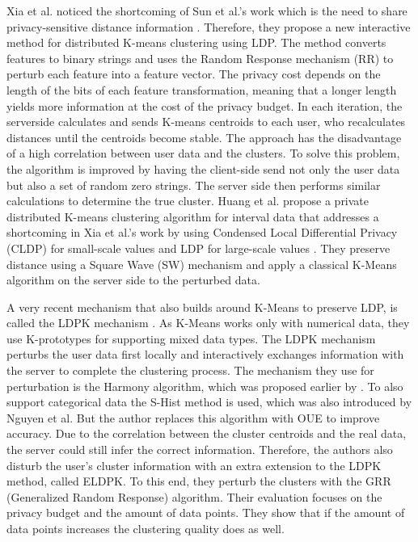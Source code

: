 Xia et al. noticed the shortcoming of Sun et al.'s work which is the need to share privacy-sensitive distance information \citep{xia_distributed_2020-1}.
Therefore, they propose a new interactive method for distributed K-means clustering using LDP.
The method converts features to binary strings and uses the Random Response mechanism (RR) to perturb each feature into a feature vector.
The privacy cost depends on the length of the bits of each feature transformation, meaning that a longer length yields more information at the cost of the privacy budget.
In each iteration, the serverside calculates and sends K-means centroids to each user, who recalculates distances until the centroids become stable.
The approach has the disadvantage of a high correlation between user data and the clusters.
To solve this problem, the algorithm is improved by having the client-side send not only the user data but also a set of random zero strings.
The server side then performs similar calculations to determine the true cluster.
Huang et al. propose a private distributed K-means clustering algorithm for interval data that addresses a shortcoming in Xia et al.'s work by using Condensed Local Differential Privacy (CLDP) for small-scale values and LDP for large-scale values \citep{9679364}.
They preserve distance using a Square Wave (SW) mechanism and apply a classical K-Means algorithm on the server side to the perturbed data.

A very recent mechanism that also builds around K-Means to preserve LDP, is called the LDPK mechanism \citep{yuan_privacypreserving_2021}.
As K-Means works only with numerical data, they use K-prototypes for supporting mixed data types.
The LDPK mechanism perturbs the user data first locally and interactively exchanges information with the server to complete the clustering process.
The mechanism they use for perturbation is the Harmony algorithm, which was proposed earlier by \citep{nguyen_collecting_2016}.
To also support categorical data the S-Hist method is used, which was also introduced by Nguyen et al.
But the author replaces this algorithm with OUE \cite{wang_locally_nodate} to improve accuracy.
Due to the correlation between the cluster centroids and the real data, the server could still infer the correct information.
Therefore, the authors also disturb the user’s cluster information with an extra extension to the LDPK method, called ELDPK.
To this end, they perturb the clusters with the GRR (Generalized Random Response) algorithm.
Their evaluation focuses on the privacy budget and the amount of data points.
They show that if the amount of data points increases the clustering quality does as well. \newline

